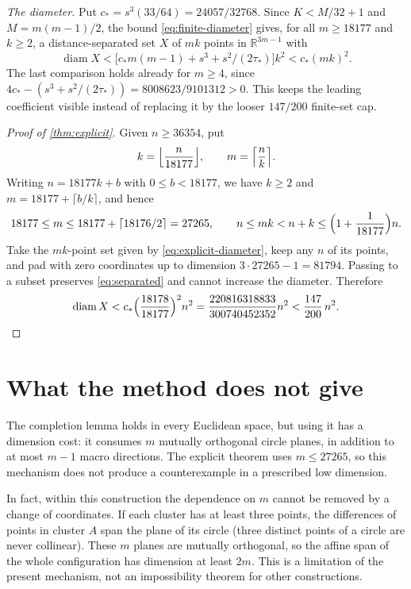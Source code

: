 \documentclass[11pt]{amsart}
\numberwithin{equation}{section}
\theoremstyle{definition}
\theoremstyle{remark}
\newcommand{\R}{\mathbb R}
\DeclareMathOperator{\diam}{diam}
\begin{document}
\emph{The diameter.} Put $c_*=s^3(33/64)=24057/32768$. Since
$K<M/32+1$ and $M=m(m-1)/2$, the bound \eqref{eq:finite-diameter}
gives, for all $m\ge18177$ and $k\ge2$, a distance-separated set $X$
of $mk$ points in $\R^{3m-1}$ with
\begin{equation}\label{eq:explicit-diameter}
 \diam X
 <\bigl[c_*m(m-1)+s^3+s^2/(2\tau_*)\bigr]k^2
 <c_*(mk)^2.
\end{equation}
The last comparison holds already for $m\ge4$, since
$4c_*-(s^3+s^2/(2\tau_*))=8008623/9101312>0$. This keeps the leading coefficient
visible instead of replacing it by the looser $147/200$ finite-set cap.

\begin{proof}[Proof of \cref{thm:explicit}]
Given $n\ge36354$, put
\[
 k=\Bigl\lfloor\frac n{18177}\Bigr\rfloor,\qquad
 m=\Bigl\lceil\frac nk\Bigr\rceil.
\]
Writing $n=18177k+b$ with $0\le b<18177$, we have $k\ge2$ and
$m=18177+\lceil b/k\rceil$, and hence
\[
 18177\le m\le18177+\lceil18176/2\rceil=27265,\qquad
 n\le mk<n+k\le\Bigl(1+\frac1{18177}\Bigr)n.
\]
Take the $mk$-point set given by \eqref{eq:explicit-diameter}, keep any
$n$ of its points, and pad with zero coordinates up to dimension
$3\cdot27265-1=81794$. Passing to a subset preserves
\eqref{eq:separated} and cannot increase the diameter. Therefore
\[
 \diam X<c_*\Bigl(\frac{18178}{18177}\Bigr)^2n^2
 =\frac{220816318833}{300740452352}n^2
 <\frac{147}{200}\,n^2.
 \qedhere
\]
\end{proof}

\section{What the method does not give}\label{sec:scope}

The completion lemma holds in every Euclidean space, but using it has a
dimension cost: it consumes $m$ mutually orthogonal circle planes, in
addition to at most $m-1$ macro directions. The explicit theorem uses
$m\le27265$, so this mechanism does not produce a counterexample in a
prescribed low dimension.

In fact, within this construction the dependence on $m$ cannot be removed
by a change of coordinates. If each cluster has at least three points,
the differences of points in cluster $A$ span the plane of its circle
(three distinct points of a circle are never collinear). These $m$ planes
are mutually orthogonal, so the affine span of the whole configuration
has dimension at least $2m$. This is a limitation of the present
mechanism, not an impossibility theorem for other constructions.
\end{document}
